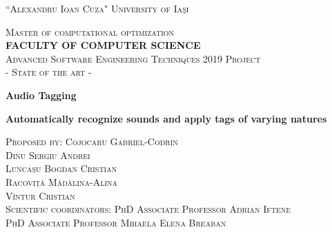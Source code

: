 \documentclass[11pt, a4papper]{report}
\theoremstyle{plain}
\theoremstyle{definition}
\theoremstyle{definition}
\theoremstyle{proposition}
\begin{document}
\begin{center}

\vspace*{.06\textheight}
{\scshape\large {``Alexandru Ioan Cuza" University of Iaşi}\par}\vspace{0.3cm} 
\textsc{\large {Master of computational optimization}}\\[0.3cm] 
\textbf{\textsc{\large {FACULTY OF COMPUTER SCIENCE }}}\\[1.3cm] 


\vspace{0.4cm}
\textsc{\large {Advanced Software Engineering Techniques 2019 Project}}\\[0.1cm]
\textsc{\large { - State of the art - }}\\[2.7cm]

\vspace{0.6cm}
{\LARGE \bfseries {Audio Tagging}\par}
\vspace{0.2cm} 
{\Large \bfseries {Automatically recognize sounds and apply tags of varying natures}\par}


\vspace{4.4cm}

\begin{center}
\textsc{\large Proposed by: Cojocaru Gabriel-Codrin}\\
\textsc{\large Dinu Sergiu Andrei} \\
\textsc{\large Luncașu Bogdan Cristian} \\
\textsc{\large Racoviță Mădălina-Alina} \\
\textsc{\large Vîntur Cristian} \\
[3.1cm]
\textsc{\large Scientific coordinators}: {\textsc{\large PhD Associate Professor Adrian Iftene}} \\
{\textsc{\large PhD Associate Professor Mihaela Elena Breaban}}
\end{center}
\end{center}
\newpage



\tableofcontents

\newpage
\end{document}
